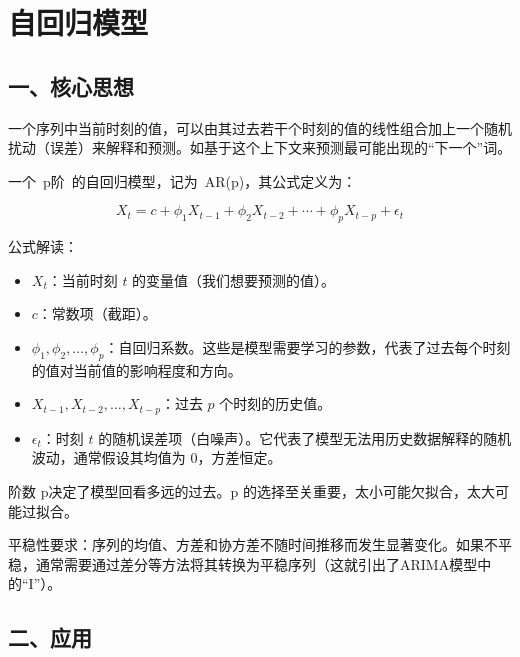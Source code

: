 \setcounter{section}{0}

\hypertarget{ux81eaux56deux5f52ux6a21ux578b}{%
\section{自回归模型}\label{ux81eaux56deux5f52ux6a21ux578b}}

\hypertarget{ux4e00ux6838ux5fc3ux601dux60f3}{%
\subsection{一、核心思想}\label{ux4e00ux6838ux5fc3ux601dux60f3}}

一个序列中当前时刻的值，可以由其过去若干个时刻的值的线性组合加上一个随机扰动（误差）来解释和预测。如基于这个上下文来预测最可能出现的``下一个''词。

一个~p阶~的自回归模型，记为~AR(p)，其公式定义为：

\[
X_t = c + \phi_1 X_{t-1} + \phi_2 X_{t-2} + \cdots + \phi_p X_{t-p} + \epsilon_t
\]

公式解读：

\begin{itemize}
\tightlist
\item
  \(X_t\)：当前时刻 \(t\) 的变量值（我们想要预测的值）。
\item
  \(c\)：常数项（截距）。
\item
  \(\phi_1, \phi_2, \ldots, \phi_p\)：自回归系数。这些是模型需要学习的参数，代表了过去每个时刻的值对当前值的影响程度和方向。
\item
  \(X_{t-1}, X_{t-2}, \ldots, X_{t-p}\)：过去 \(p\) 个时刻的历史值。
\item
  \(\epsilon_t\)：时刻 \(t\) 的随机误差项（白噪声）。它代表了模型无法用历史数据解释的随机波动，通常假设其均值为 0，方差恒定。
\end{itemize}

阶数 p决定了模型回看多远的过去。p 的选择至关重要，太小可能欠拟合，太大可能过拟合。

平稳性要求：序列的均值、方差和协方差不随时间推移而发生显著变化。如果不平稳，通常需要通过差分等方法将其转换为平稳序列（这就引出了ARIMA模型中的``I''）。

\hypertarget{ux4e8cux5e94ux7528}{%
\subsection{二、应用}\label{ux4e8cux5e94ux7528}}

